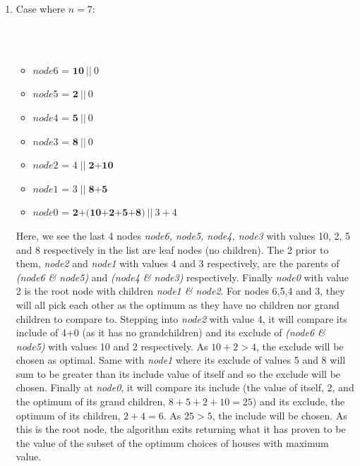 \documentclass[11pt, oneside]{article}   	%
\begin{document}
\begin{enumerate}
\begin{enumerate}
\begin{enumerate}
			\newpage
			\item Case where $n=7$:\\
			\\
			\\
			\begin{itemize}
				\item $node6$ = $\textbf{10}\:|| \:0$
				\item $node5$ = $\textbf{2}\:|| \:0$
				\item $node4$ = $\textbf{5}\:|| \:0$
				\item $node3$ = $\textbf{8}\:|| \:0$
				\item $node2$ = $4\;|| \;\textbf{2+10}$
				\item $node1$ = $3\;|| \;\textbf{8+5}$
				\item $node0$ = $\textbf{2+(10+2+5+8)}\:|| \:3+4$
			\end{itemize}
			Here, we see the last 4 nodes \textit{node6, node5, node4, node3} with values 10, 2, 5 and 8 respectively in the list are leaf nodes (no children). The 2 prior to them, \textit{node2} and \textit{node1} with values 4 and 3 respectively, are the parents of \textit{(node6 \& node5)} and \textit{(node4 \& node3)} respectively. Finally \textit{node0} with value 2 is the root node with children \textit{node1 \& node2}. For nodes 6,5,4 and 3, they will all pick each other as the optimum as they have no children nor grand children to compare to. Stepping into \textit{node2} with value 4, it will compare its include of 4+0 (as it has no grandchildren) and its exclude of \textit{(node6 \& node5)} with values 10 and 2 respectively. As $10+2>4$, the exclude will be chosen as optimal. Same with \textit{node1} where its exclude of values 5 and 8 will sum to be greater than its include value of itself and so the exclude will be chosen. Finally at \textit{node0}, it will compare its include (the value of itself, 2, and the optimum of its grand children, $8+5+2+10=25$) and its exclude, the optimum of its children, $2+4=6$. As $25>5$, the include will be chosen. As this is the root node, the algorithm exits returning what it has proven to be the value of the subset of the optimum choices of houses with maximum value.
			

\end{enumerate}
\end{enumerate}
\end{enumerate}
\end{document}
